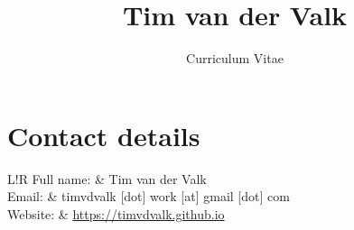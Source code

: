 \documentclass[9pt]{article}
\title{\bfseries\Huge Tim van der Valk}
\author{Curriculum Vitae}
\date{}
\newcommand\VRule{\color{lightgray}\vrule width 0.5pt}
\begin{document}
\maketitle


\vspace{-0pt}
\section*{Contact details}
\vspace{-3pt}\begin{tabular}{L!{\VRule}R}
	Full name: & Tim van der Valk \\
	Email: & timvdvalk [dot] work [at] gmail [dot] com \\[2pt]
	Website: & \url{https://timvdvalk.github.io} \\\\[2pt]
\end{tabular}




\end{document}
